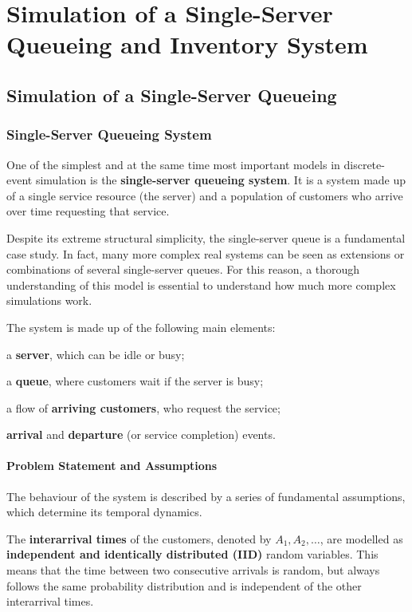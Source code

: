 \chapter{Simulation of a Single-Server Queueing and Inventory System}

\section{Simulation of a Single-Server Queueing}

\subsection{Single-Server Queueing System}

One of the simplest and at the same time most important models in discrete-event simulation is the \textbf{single-server queueing system}.
It is a system made up of a single service resource (the server) and a population of customers who arrive over time requesting that service.

Despite its extreme structural simplicity, the single-server queue is a fundamental case study. In fact, many more complex real systems can be seen as extensions or combinations of several single-server queues. For this reason, a thorough understanding of this model is essential to understand how much more complex simulations work.

The system is made up of the following main elements:
\begin{compactitemize}
    \item a \textbf{server}, which can be idle or busy;
    \item a \textbf{queue}, where customers wait if the server is busy;
    \item a flow of \textbf{arriving customers}, who request the service;
    \item \textbf{arrival} and \textbf{departure} (or service completion) events.
\end{compactitemize}

\subsubsection{Problem Statement and Assumptions}

The behaviour of the system is described by a series of fundamental assumptions, which determine its temporal dynamics.

The \textbf{interarrival times} of the customers, denoted by $A_1, A_2, \dots$, are modelled as \textbf{independent and identically distributed (IID)} random variables. This means that the time between two consecutive arrivals is random, but always follows the same probability distribution and is independent of the other interarrival times.

